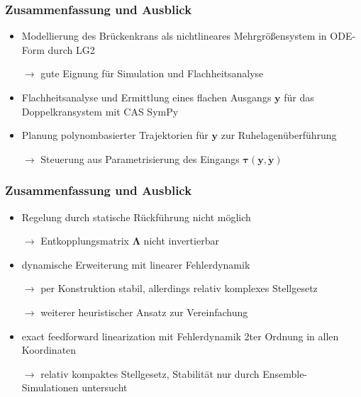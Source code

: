 \documentclass[
	ngerman,
	10pt,				%
	aspectratio=169 	%
]{beamer}
\begin{document}

\begin{frame}[label=Zusammenfassung1]
	\frametitle{Zusammenfassung {und Ausblick}}
	\begin{itemize}
		\item Modellierung des Brückenkrans als nichtlineares Mehrgrößensystem in ODE-Form durch LG2
		\item[$\rightarrow$] gute Eignung für Simulation und Flachheitsanalyse
		\bigskip
		\pause
		\item Flachheitsanalyse und Ermittlung eines flachen Ausgangs $\mathbf{y}$ für das Doppelkransystem mit CAS SymPy
		\bigskip
		\pause
		\item Planung polynombasierter Trajektorien für $\mathbf{y}$ zur Ruhelagenüberführung
		\item[$\rightarrow$] Steuerung aus Parametrisierung des Eingangs $\boldsymbol{\tau}(\mathbf{y}, \dot{\mathbf{y}})$
		
	\end{itemize}
	
\end{frame}


\begin{frame}[label=Zusammenfassung2]
	\frametitle{Zusammenfassung {und Ausblick}}
	\begin{itemize}
		\item Regelung durch statische Rückführung nicht möglich
		\item[$\rightarrow$] Entkopplungsmatrix $\boldsymbol{\Lambda}$ nicht invertierbar
		\pause
		\item dynamische Erweiterung mit linearer Fehlerdynamik
		\item[$\rightarrow$] per Konstruktion stabil, allerdings relativ komplexes Stellgesetz
		\pause
		\item[$\rightarrow$] weiterer heuristischer Ansatz zur Vereinfachung
		\pause
		\item exact feedforward linearization mit Fehlerdynamik 2ter Ordnung in allen Koordinaten
		\item[$\rightarrow$] relativ kompaktes Stellgesetz, Stabilität nur durch Ensemble-Simulationen untersucht
		
	\end{itemize}
	
\end{frame}
\end{document}
